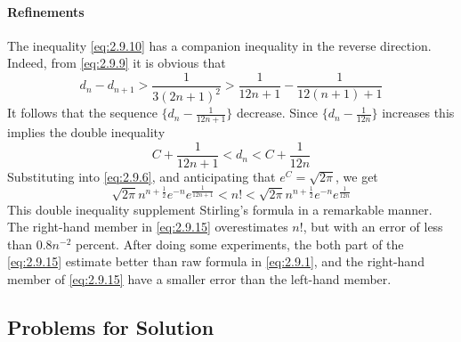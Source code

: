 \documentclass{article}
\numberwithin{equation}{subsection}
\begin{document}
			\paragraph{Refinements} The inequality \eqref{eq:2.9.10} has a companion inequality in the reverse direction. Indeed, from \eqref{eq:2.9.9} it is obvious that
			\begin{equation}
				d_n-d_{n+1} > \frac{1}{3(2n+1)^2} > \frac{1}{12n+1} - \frac{1}{12(n+1)+1}
			\end{equation} It follows that the sequence $\{d_n-\frac{1}{12n+1}\}$ decrease. Since $\{d_n-\frac{1}{12n}\}$ increases this implies the double inequality
			\begin{equation}
				C+\frac{1}{12n+1} < d_n < C+\frac{1}{12n}
			\end{equation}
			Substituting into \eqref{eq:2.9.6}, and anticipating that $e^C=\sqrt{2\pi}$, we get
			\begin{equation}
				\label{eq:2.9.15}
				\sqrt{2\pi}n^{n+\frac{1}{2}}e^{-n}e^{\frac{1}{12n+1}} < n! < \sqrt{2\pi}n^{n+\frac{1}{2}}e^{-n}e^{\frac{1}{12n}}
			\end{equation}
			This double inequality supplement Stirling's formula in a remarkable manner. The right-hand member in \eqref{eq:2.9.15} overestimates $n!$, but with an error of less than $0.8n^{-2}$ percent. After doing some experiments, the both part of the \eqref{eq:2.9.15} estimate better than raw formula in \eqref{eq:2.9.1}, and the right-hand member of \eqref{eq:2.9.15} have a smaller error than the left-hand member.
		\subsection{Problems for Solution}
\end{document}
